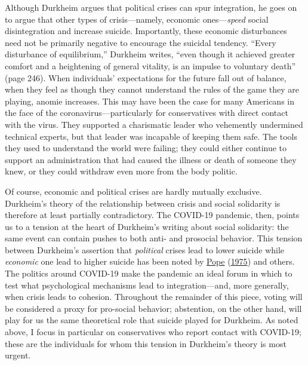 \documentclass[
  12pt,
]{article}
\begin{document}
Although Durkheim argues that political crises can spur integration, he goes on to argue that other types of crisis---namely, economic ones---\emph{speed} social disintegration and increase suicide. Importantly, these economic disturbances need not be primarily negative to encourage the suicidal tendency. ``Every disturbance of equilibrium,'' Durkheim writes, ``even though it achieved greater comfort and a heightening of general vitality, is an impulse to voluntary death'' (page 246). When individuals' expectations for the future fall out of balance, when they feel as though they cannot understand the rules of the game they are playing, anomie increases. This may have been the case for many Americans in the face of the coronavirus---particularly for conservatives with direct contact with the virus. They supported a charismatic leader who vehemently undermined technical experts, but that leader was incapable of keeping them safe. The tools they used to understand the world were failing; they could either continue to support an administration that had caused the illness or death of someone they knew, or they could withdraw even more from the body politic.

Of course, economic and political crises are hardly mutually exclusive. Durkheim's theory of the relationship between crisis and social solidarity is therefore at least partially contradictory. The COVID-19 pandemic, then, points us to a tension at the heart of Durkheim's writing about social solidarity: the same event can contain pushes to both anti- and prosocial behavior. This tension between Durkheim's assertion that \emph{political} crises lead to lower suicide while \emph{economic} one lead to higher suicide has been noted by \protect\hyperlink{ref-Pope1975}{Pope} (\protect\hyperlink{ref-Pope1975}{1975}) and others. The politics around COVID-19 make the pandemic an ideal forum in which to test what psychological mechanisms lead to integration---and, more generally, when crisis leads to cohesion. Throughout the remainder of this piece, voting will be considered a proxy for pro-social behavior; abstention, on the other hand, will play for us the same theoretical role that suicide played for Durkheim. As noted above, I focus in particular on conservatives who report contact with COVID-19; these are the individuals for whom this tension in Durkheim's theory is most urgent.
\end{document}
